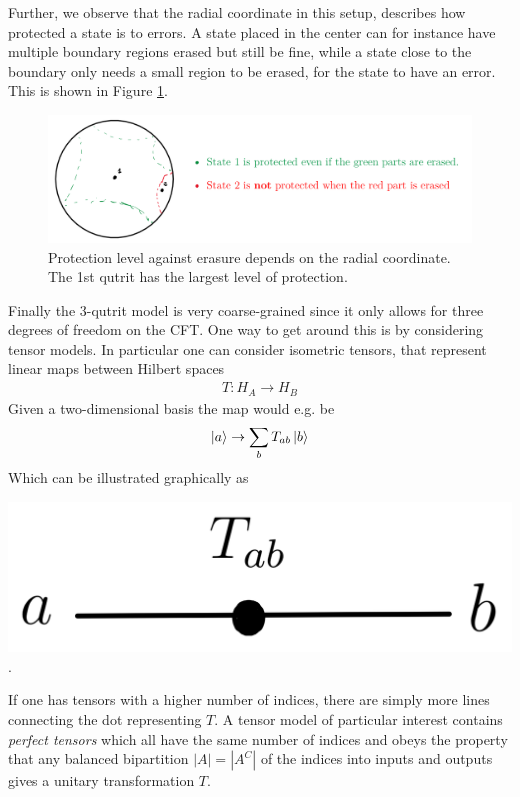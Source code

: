 \documentclass[letter,12pt]{article}
\begin{document}
Further, we observe that the radial coordinate in this setup, describes how protected a state is to errors. A state placed in the center can for instance have multiple boundary regions erased but still be fine, while a state close to the boundary only needs a small region to be erased, for the state to have an error. This is shown in Figure \ref{fig:adscftfig7}.
\begin{figure}[]
	\centering
	\includegraphics[width=0.9\linewidth]{ADS_CFT_Fig7}
	\caption{Protection level against erasure depends on the radial coordinate. The 1st qutrit has the largest level of protection.}
	\label{fig:adscftfig7}
\end{figure}

Finally the 3-qutrit model is very coarse-grained since it only allows for three degrees of freedom on the CFT. One way to get around this is by considering tensor models. In particular one can consider isometric tensors, that represent linear maps between Hilbert spaces 
\begin{equation}
	\begin{aligned}
		T: H_A\to H_B
	\end{aligned}
\end{equation}
Given a two-dimensional basis the map would e.g. be
\begin{equation}
	\begin{aligned}
		\ket{a}\to \sum_b T_{ab}\ket{b}
	\end{aligned}
\end{equation} 
Which can be illustrated graphically as\\ 
\begin{center}
\includegraphics[width=0.25\linewidth]{ADS_CFT_Fig9}.
\end{center}

If one has tensors with a higher number of indices, there are simply more lines connecting the dot representing $T$. A tensor model of particular interest contains \textit{perfect tensors} which all have the same number of indices and obeys the property that any balanced bipartition $|A|=|A^C|$ of the indices
into inputs and outputs gives a unitary transformation $T$.
\end{document}
